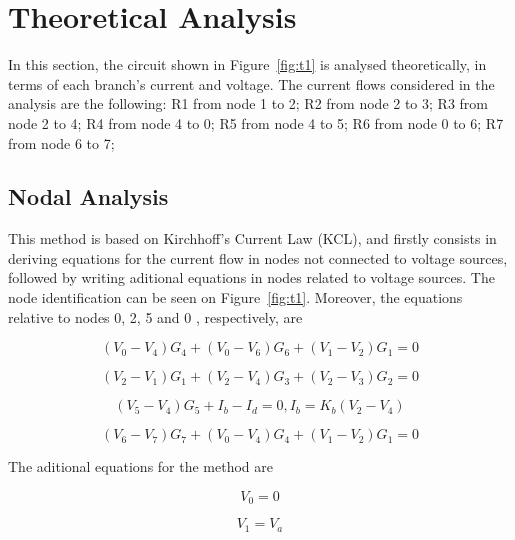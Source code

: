 \section{Theoretical Analysis}
\label{sec:analysis}

In this section, the circuit shown in Figure~\ref{fig:t1} is analysed
theoretically, in terms of each branch's current and voltage.
The current flows considered in the analysis are the following:
R1 from node 1 to 2; R2 from node 2 to 3; R3 from node 2 to 4; R4 from node 4 to 0; R5 from node 4 to 5; R6 from node 0 to 6; R7 from node 6 to 7;

\subsection{Nodal Analysis}

This method is based on Kirchhoff's Current Law (KCL), and firstly consists in
deriving equations for the current flow in nodes not connected to voltage sources,
followed by writing aditional equations in nodes related to voltage sources. The node 
identification can be seen on Figure~\ref{fig:t1}. Moreover, the equations relative to
nodes 0, 2, 5 and 0 , respectively, are

\begin{equation}
  (V_0 - V_4)G_4 + (V_0 - V_6)G_6 + (V_1 - V_2)G_1 = 0 
  \label{eq:kvl}
\end{equation}

\begin{equation}
  (V_2 - V_1)G_1 + (V_2 - V_4)G_3 + (V_2 - V_3)G_2 = 0 
  \label{eq:kvl2}
\end{equation}

\begin{equation}
  (V_5 - V_4)G_5 + I_b - I_d = 0 , I_b = K_b(V_2 - V_4) 
  \label{eq:kvl3}
\end{equation}

\begin{equation}
  (V_6 - V_7)G_7 + (V_0 - V_4)G_4 + (V_1 - V_2)G_1 = 0 
  \label{eq:kvl4}
\end{equation}

The aditional equations for the method are

\begin{equation}
  V_0 = 0
  \label{eq:kvl5}
\end{equation}

\begin{equation}
  V_1 = V_a
  \label{eq:kvl6}
\end{equation}


